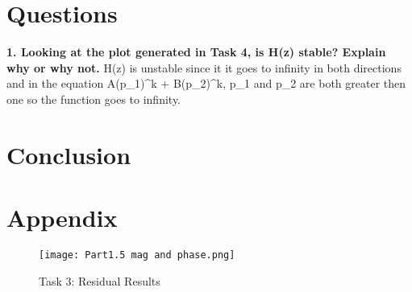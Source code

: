 \documentclass[12pt]{report}
\begin{document}
 
\section{Questions}
\textbf{1. Looking at the plot generated in Task 4, is H(z) stable? Explain why or why not.}\NEWLINE \NEWLINE
H(z) is unstable since it it goes to infinity in both directions and in the equation A(p_1)^k + B(p_2)^k, p_1 and p_2 are both greater then one so the function goes to infinity. 

\section{Conclusion}

\section{Appendix}
\begin{figure}[h!]
    \centering
    \texttt{[image: Part1.5 mag and phase.png]}
    \caption{Task 3: Residual Results }
    \label{Task 5}
    \newpage 
\end{figure}
\newpage

\newpage
\end{document}
